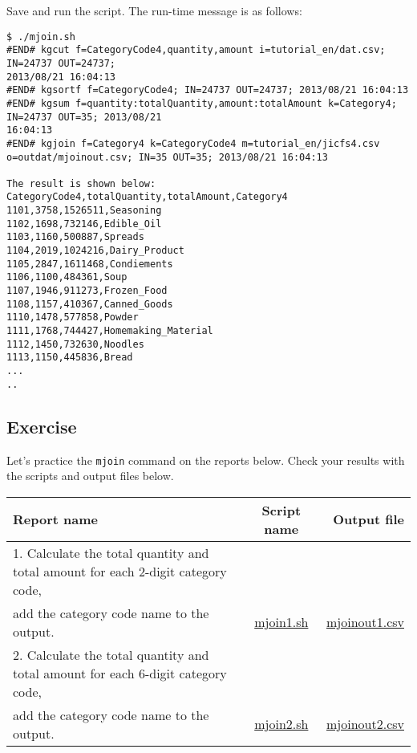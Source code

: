 Save and run the script. The run-time message is as follows: \\

\begin{verbatim}
$ ./mjoin.sh
#END# kgcut f=CategoryCode4,quantity,amount i=tutorial_en/dat.csv; IN=24737 OUT=24737; 
2013/08/21 16:04:13
#END# kgsortf f=CategoryCode4; IN=24737 OUT=24737; 2013/08/21 16:04:13
#END# kgsum f=quantity:totalQuantity,amount:totalAmount k=Category4; IN=24737 OUT=35; 2013/08/21 
16:04:13
#END# kgjoin f=Category4 k=CategoryCode4 m=tutorial_en/jicfs4.csv o=outdat/mjoinout.csv; IN=35 OUT=35; 2013/08/21 16:04:13

The result is shown below: 
CategoryCode4,totalQuantity,totalAmount,Category4
1101,3758,1526511,Seasoning
1102,1698,732146,Edible_Oil
1103,1160,500887,Spreads
1104,2019,1024216,Dairy_Product
1105,2847,1611468,Condiements
1106,1100,484361,Soup
1107,1946,911273,Frozen_Food
1108,1157,410367,Canned_Goods
1110,1478,577858,Powder
1111,1768,744427,Homemaking_Material
1112,1450,732630,Noodles
1113,1150,445836,Bread
...
..
\end{verbatim}


\subsection{Exercise }

Let's practice the \verb|mjoin| command on the reports below. Check your results with the scripts and output files below. 

\begin{table}[htbp]
{\small
\begin{tabular}{ l | c || r }
\hline
\textbf{Report name}   & \textbf{Script name} & \textbf{Output file}  \\
\hline
1. Calculate the total quantity and total amount for each 2-digit category code, \\add the category code name to the output.  & \href{exercise/mjoin1.sh}{mjoin1.sh} & \href{exercise/outdat/mjoinout1.csv}{mjoinout1.csv} \\
2. Calculate the total quantity and total amount for each 6-digit category code, \\ add the category code name to the output.  & \href{exercise/mjoin2.sh}{mjoin2.sh} & \href{exercise/outdat/mjoinout2.csv}{mjoinout2.csv} \\

\hline
\end{tabular} 
}
\end{table} 


%
